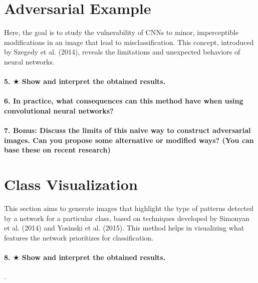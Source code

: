 \section{Adversarial Example}

Here, the goal is to study the vulnerability of CNNs to minor, imperceptible modifications in an image that lead to misclassification. This concept, introduced by Szegedy et al. (2014), reveals the limitations and unexpected behaviors of neural networks.

\paragraph*{5. $ \bigstar $ Show and interpret the obtained results.}

\paragraph*{6. In practice, what consequences can this method have when using convolutional neural networks?}

\paragraph*{7. \textbf{Bonus:} Discuss the limits of this naive way to construct adversarial images. Can you propose some alternative or modiﬁed ways? (You can base these on recent research)}

\section{Class Visualization}

This section aims to generate images that highlight the type of patterns detected by a network for a particular class, based on techniques developed by Simonyan et al. (2014) and Yosinski et al. (2015). This method helps in visualizing what features the network prioritizes for classification.

\paragraph*{8. $ \bigstar $ Show and interpret the obtained results.}

.

